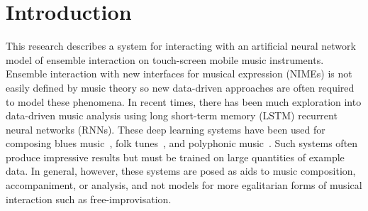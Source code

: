 \documentclass[sigchi-a, authorversion]{acmart}
\begin{document}
\maketitle

\section{Introduction}

This research describes a system for interacting with an artificial
neural network model of ensemble interaction on touch-screen mobile
music instruments. Ensemble interaction with new interfaces for
musical expression (NIMEs) is not easily defined by music theory so
new data-driven approaches are often required to model these
phenomena. In recent times, there has been much exploration into
data-driven music analysis using long short-term memory (LSTM)
recurrent neural networks (RNNs). These deep learning systems have
been used for composing blues music~\cite{Eck:2007rw}, folk
tunes~\cite{Sturm:2016rz}, and polyphonic music~\cite{Walder:2016le}.
Such systems often produce impressive results but must be trained on
large quantities of example data. In general, however, these systems
are posed as aids to music composition, accompaniment, or analysis,
and not models for more egalitarian forms of musical interaction such
as free-improvisation.
\end{document}
